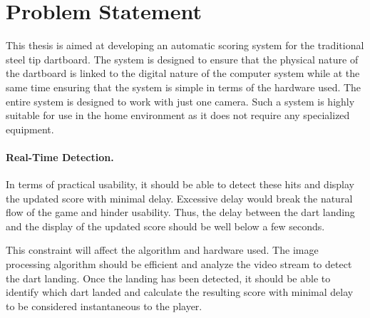 \section{Problem Statement}

This thesis is aimed at developing an automatic scoring system for the traditional steel tip dartboard. The system is designed to ensure that the physical nature of the dartboard is linked to the digital nature of the computer system while at the same time ensuring that the system is simple in terms of the hardware used. The entire system is designed to work with just one camera. Such a system is highly suitable for use in the home environment as it does not require any specialized equipment.

\paragraph{Real-Time Detection.}

In terms of practical usability, it should be able to detect these hits and display the updated score with minimal delay. Excessive delay would break the natural flow of the game and hinder usability. Thus, the delay between the dart landing and the display of the updated score should be well below a few seconds.

This constraint will affect the algorithm and hardware used. The image processing algorithm should be efficient and analyze the video stream to detect the dart landing. Once the landing has been detected, it should be able to identify which dart landed and calculate the resulting score with minimal delay to be considered instantaneous to the player.
